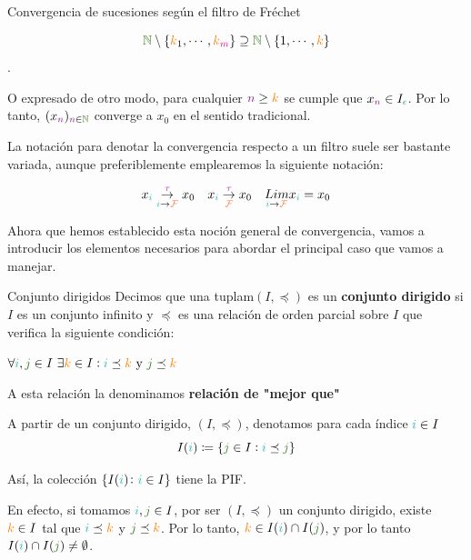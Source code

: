 \documentclass[titlepage,11pt,a4paper]{book}
\newcommand{\NN}{\ensuremath{\textcolor{OliveGreen}{\mathbb{N}}}}
\newcommand{\filt}{\ensuremath{\textcolor{Orange}{\mathcal{F}}}}
\newcommand{\ii}{\ensuremath{\textcolor{TealBlue}{i}}}
\newcommand{\jj}{\ensuremath{\textcolor{OliveGreen}{j}}}
\newcommand{\nn}{\ensuremath{\textcolor{Plum}{n}}}
\newcommand{\mm}{\ensuremath{\textcolor{Magenta}{m}}}
\newcommand{\eps}{\textcolor{ForestGreen}{\epsilon}}
\newcommand{\taut}{\textcolor{Fuchsia}{\tau}}
\newcommand{\kk}{\textcolor{orange}{k}}
\begin{document}
\begin{ejemplo*}{Convergencia de sucesiones según el filtro de Fréchet}
\begin{itemize}
             $$
             \NN \setminus \{\kk_{1}, \cdots, \kk_{\mm}\} \supseteq \NN \setminus \{1, \cdots, \kk\} 
             $$.

             O expresado de otro modo, para cualquier $\nn \geq \kk$ se cumple que $x_{\nn} \in I_{\eps}$. Por lo tanto, $(x_{\nn})_{\nn \in \NN}$ converge a $x_{0}$ en el sentido tradicional.
        \end{itemize}
     \end{ejemplo*}

     \medskip

     La notación para denotar la convergencia respecto a un filtro suele ser bastante variada, aunque preferiblemente emplearemos la siguiente notación:

     \[
     \begin{array}{llllc}
        x_{\ii} \underset{\ii \to \filt}{\overset{\taut}{\to}} x_{0} & x_{\ii} \underset{\filt}{\overset{\taut}{\to}} x_{0} & \underset{\ii \to \filt}{Lim} x_{\ii} =  x_{0} 
     \end{array}
     \]

     \medskip

     Ahora que hemos establecido esta noción general de convergencia, vamos a introducir los elementos necesarios para abordar el principal caso que vamos a manejar.

     \begin{defn*}{Conjunto dirigidos}
        Decimos que una tuplam$(I, \preceq)$ es un \textbf{conjunto dirigido} si $I$ es un conjunto infinito y $\preceq$ es una relación de orden parcial sobre $I$ que verifica la siguiente condición:
         
        \begin{center}
            $
            \forall \ii, \jj \in I \ \exists \kk \in I : \ii \preceq \kk \text{ y } \jj \preceq \kk
            $
        \end{center}

        A esta relación la denominamos \textbf{relación de "mejor que"}
     \end{defn*}

     \smallskip
     A partir de un conjunto dirigido, $(I,\preceq)$, denotamos para cada índice $\ii \in I$
        \[
            I(\ii) \coloneq \{\jj \in I : \ii \preceq \jj\}    
        \]

    \smallskip
    Así, la colección $\{I(\ii) \colon \ii \in I\}$ tiene la PIF.

    \medskip
    En efecto, si tomamos $\ii, \jj \in I$, por ser $(I,\preceq)$ un conjunto dirigido, existe $\kk \in I$ tal que $\ii \preceq \kk$ y $\jj \preceq \kk$. Por lo tanto, $\kk \in I(\ii) \cap I(\jj)$, y por lo tanto $I(\ii) \cap I(\jj) \neq \emptyset$.
\end{document}
